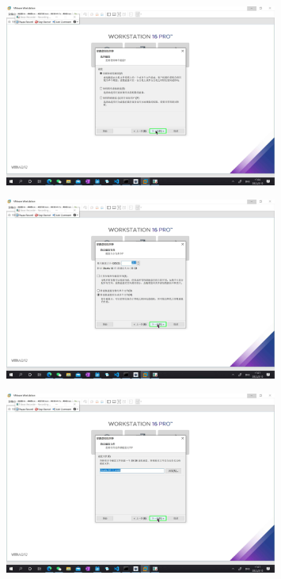 \documentclass[UTF8]{ctexart}
\begin{document}
    \begin{figure}[H]
        \centering
        \includegraphics[width=0.8\textwidth]{assets/u15.png}
    \end{figure}
    \begin{figure}[H]
        \centering
        \includegraphics[width=0.8\textwidth]{assets/u16.png}
    \end{figure}
    \begin{figure}[H]
        \centering
        \includegraphics[width=0.8\textwidth]{assets/u17.png}
    \end{figure}
\end{document}
